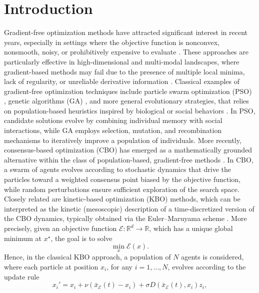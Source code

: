 \documentclass[11pt,handout]{article}%
\numberwithin{equation}{section}
\theoremstyle{definition}
\def\RR{\mathbb R}
\begin{document}
\section{Introduction}\label{sec:intro} 
Gradient-free optimization methods have attracted significant interest in recent years, especially in settings where the objective function is nonconvex, nonsmooth, noisy, or prohibitively expensive to evaluate \cite{kennedy1995particle, blum2003metaheuristics, borghi2024kinetic}. These approaches are particularly effective in high-dimensional and multi-modal landscapes, where gradient-based methods may fail due to the presence of multiple local minima, lack of regularity, or unreliable derivative information \cite{borghi2023adaptive,ferrarese2025localized}.
Classical examples of gradient-free optimization techniques include particle swarm optimization (PSO) \cite{kennedy1995particle, grassi2021particle}, genetic algorithms (GA) \cite{michalewicz1996genetic,mitchell1995genetic}, and more general evolutionary strategies, that relies on population-based heuristics inspired by biological or social behaviors \cite{blum2003metaheuristics}. In PSO, candidate solutions evolve by combining individual memory with social interactions, while GA employs selection, mutation, and recombination mechanisms to iteratively improve a population of individuals.
More recently, consensus-based optimization (CBO) has emerged as a mathematically grounded alternative within the class of population-based, gradient-free methods \cite{carrillo2018analytical, fornasier2020consensus, fornasier2021consensus}. In CBO, a swarm of agents evolves according to stochastic dynamics that drive the particles toward a weighted consensus point biased by the objective function, while random perturbations ensure sufficient exploration of the search space. Closely related are kinetic-based optimization (KBO) methods, which can be interpreted as the kinetic (mesoscopic) description of a time-discretized version of the CBO dynamics, typically obtained via the Euler–Maruyama scheme \cite{benfenati2022binary}. More precisely, given an objective function $\mathcal{E}:\RR^d\to \RR$, which has a unique global minimum at $x^\star$, the goal is to solve
\begin{equation}
	\min_x \mathcal{E}(x).
\end{equation}
Hence, in the classical KBO approach, a population of $N$ agents is considered, where each particle at position $x_i$, for any $i=1, \ldots ,N$, evolves according to the update rule
\begin{equation}\label{eq:KBO}
	x_i' = x_i + \nu   (\bar{x}_{\mathcal{E}}(t) - x_i) + \sigma  D(\bar{x}_{\mathcal{E}}(t), x_i)   z_i,
\end{equation}
\end{document}
